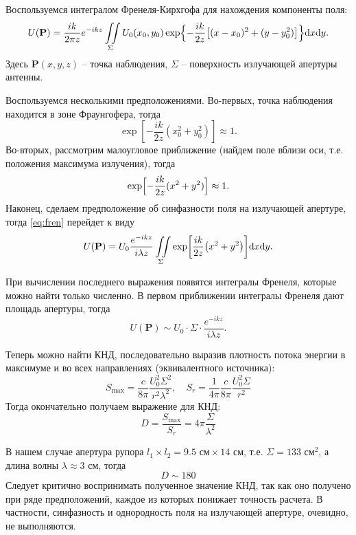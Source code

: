 \documentclass[a4paper,14pt]{extarticle}
\begin{document}
Воспользуемся интегралом Френеля-Кирхгофа для нахождения компоненты поля:
\begin{equation}
  U(\mathbf{P})=\frac{ik}{2\pi z}e^{-ikz}\iint\limits_{\Sigma}U_0(x_0,y_0)\exp \Bigl\{-\frac{ik}{2z}\qty[(x-x_0)^2+(y-y_0^2)]\Bigr\}\dd x \dd y.
  \label{eq:fren}
\end{equation}
Здесь $\mathbf{P}(x,y,z)$ -- точка наблюдения, $\Sigma$ -- поверхность излучающей апертуры антенны.

Воспользуемся несколькими предположениями. Во-первых, точка наблюдения находится в зоне Фраунгофера, тогда $$\exp[-\frac{ik}{2z}(x_0^2+y_0^2)]\approx 1.$$ Во-вторых, рассмотрим малоугловое приближение (найдем поле вблизи оси, т.е. положения максимума излучения), тогда $$\exp \Bigl[-\frac{ik}{2z}(x^2+y^2)\Bigr]\approx 1.$$ Наконец, сделаем предположение об синфазности поля на излучающей апертуре, тогда \eqref{eq:fren} перейдет к виду
\begin{equation}
    U(\mathbf{P}) = U_0\frac{ e^{-i k z} }{i \lambda z} \iint\limits_{\Sigma}\exp[\frac{i k}{2 z}\qty(x^2+y^2)]\dd x \dd y.
    \label{eq:up1}
\end{equation}

При вычислении последнего выражения появятся интегралы Френеля, которые можно найти только численно. В первом приближении интегралы Френеля дают площадь апертуры, тогда
\begin{equation}
    U(\mathbf{P}) \sim U_0\cdot \Sigma \cdot \frac{e^{-i k z}}{i\lambda z}.
    \label{eq:up}
\end{equation}

Теперь можно найти КНД, последовательно выразив плотность потока энергии в максимуме и во всех направлениях (эквивалентного источника):
\begin{equation}
    S_{\max} = \frac{c}{8 \pi} \frac{U_0^2 \Sigma^2}{r^2 \lambda^2}, \quad S_{r} =\frac{1}{4 \pi } \frac{c}{8 \pi} \frac{U_0^2 \Sigma}{r^2 } 
    \label{eq:smsr}
\end{equation}
Тогда окончательно получаем выражение для КНД:
\begin{equation}
    D = \frac{S_{\max}}{S_r} = 4\pi\frac{\Sigma}{\lambda^2}
    \label{eq:kndt}
\end{equation}

В нашем случае апертура рупора $l_1\times l_2 = 9.5 \text{ см} \times 14\text{ см}$, т.е. $\Sigma = 133 \text{ см}^2$, а длина волны $\lambda \approx 3$ см, тогда 
\begin{equation}
  D\sim 180
\end{equation}
Следует критично воспринимать полученное значение КНД, так как оно получено при ряде предположений, каждое из которых понижает точность расчета. В частности, синфазность и однородность поля на излучающей апертуре, очевидно, не выполняются.
\end{document}
